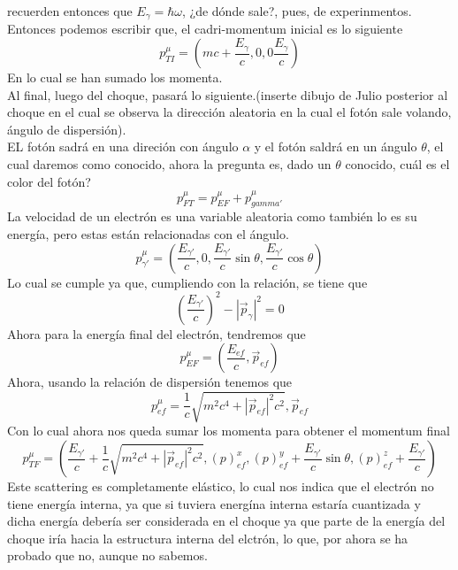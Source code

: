 \documentclass[../main.tex]{subfiles}
\begin{document}
recuerden entonces que $E_\gamma=\hbar \omega$, ¿de dónde sale?, pues, de experinmentos. Entonces podemos escribir que, el cadri-momentum inicial es lo siguiente
\begin{equation*}
  p^\mu_{TI} = \left(  mc+\frac{E_\gamma}{c},0,0 \frac{E_\gamma}{c} \right)
\end{equation*}
En lo cual se han sumado los momenta. \\
Al final, luego del choque, pasará lo siguiente.(inserte dibujo de Julio posterior al choque en el cual se observa la dirección aleatoria en la cual el fotón sale volando, ángulo de dispersión). \\
EL fotón sadrá en una direción con ángulo $\alpha$ y el fotón saldrá en un ángulo $\theta$, el cual daremos como conocido, ahora la pregunta es, dado un $\theta$ conocido, cuál es el color del fotón?  \\
\begin{equation}
  p^\mu_{FT} = p^\mu_{EF} + p^\mu_{gamma ' }
\end{equation}
La velocidad de un electrón es una variable aleatoria como también lo es su energía, pero estas están relacionadas con el ángulo.
\begin{equation*}
  p_{\gamma '}^\mu = \left(\frac{E_{\gamma '}}{c}, 0,\frac{E_{\gamma '}}{c}\sin{\theta},\frac{E_{\gamma '}}{c}\cos{\theta}\right)
\end{equation*}
Lo cual se cumple ya que, cumpliendo con la relación, se tiene que 
\begin{equation*}
  \left(\frac{E_{\gamma '}}{c}\right)^2-|\vec{p}_\gamma|^2 = 0
\end{equation*}
Ahora para la energía final del electrón, tendremos que
\begin{equation*}
  p^\mu_{EF} = \left(\frac{E_{ef}}{c},\vec{p}_{ef}\right)
\end{equation*}
Ahora, usando la relación de dispersión tenemos que
\begin{equation*}
  p^\mu_{ef} =  \frac{1}{c}\sqrt{m^2c^4+|\vec{p}_{ef}|^2c^2}, \vec{p}_{ef}
\end{equation*}
Con lo cual ahora nos queda sumar los momenta para obtener el momentum final
\begin{equation*}
  p^\mu_{TF} = \left(\frac{E_{\gamma '}}{c} + \frac{1}{c}\sqrt{m^2c^4 + |\vec{p}_{ef}|^2c^2} , (p)^x_{ef},(p)^y_{ef} + \frac{E_{\gamma '}}{c}\sin{\theta}, (p)^z_{ef}+\frac{E_{\gamma'}}{c}\right)
\end{equation*}
Este scattering es completamente elástico, lo cual nos indica que el electrón no tiene energía interna, ya que si tuviera energína interna estaría cuantizada y dicha energía debería ser considerada en el choque ya que parte de la energía del choque iría hacia la estructura interna del elctrón, lo que, por ahora se ha probado que no, aunque no sabemos.  \\
\end{document}
